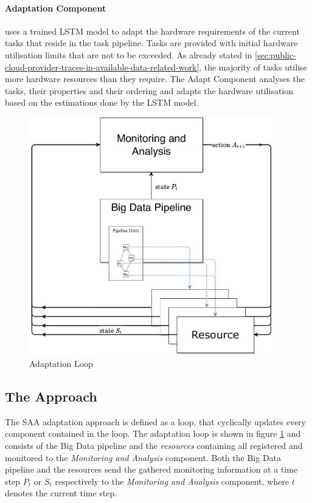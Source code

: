       
      \paragraph{Adaptation Component}
      \label{par:adapt-component-saa-background}
      
        uses a trained LSTM model to adapt the hardware requirements of the current tasks that reside in the task pipeline.
        Tasks are provided with initial hardware utilisation limits that are not to be exceeded. As already stated in \ref{sec:public-cloud-provider-traces-in-available-data-related-work}, the majority of tasks utilise more hardware resources than they require. The Adapt Component analyses the tasks, their properties and their ordering and adapts the hardware utilisation based on the estimations done by the LSTM model.

  \begin{figure}[h!]
      \centering
      \includegraphics[width=0.95\textwidth]{figures/monitoring_with_inner_resources.drawio.pdf}
      \caption{Adaptation Loop}
      \label{fig:adaptation-loop}
  \end{figure}

  \subsection{The Approach}

    The SAA adaptation approach is defined as a loop, that cyclically updates every component contained in the loop.
    The adaptation loop is shown in figure \ref{fig:adaptation-loop} and consists of the Big Data pipeline and the \emph{resources} containing all registered and monitored to the \emph{Monitoring and Analysis} component. 
    Both the Big Data pipeline and the resources send the gathered monitoring information at a time step $P_t$ or $S_t$ respectively to the \emph{Monitoring and Analysis} component, where $t$ denotes the current time step.

